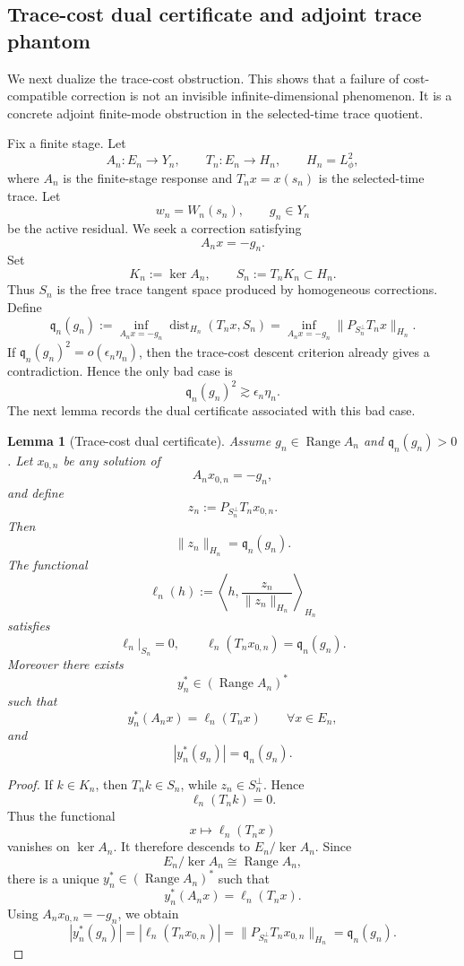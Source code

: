 \documentclass[11pt]{article}
\numberwithin{equation}{section}
\theoremstyle{plain}
\newtheorem{lemma}{Lemma}[section]
\theoremstyle{definition}
\theoremstyle{remark}
\DeclareMathOperator{\Range}{Range}
\begin{document}
\subsection{Trace-cost dual certificate and adjoint trace phantom}
\label{pV:sec:trace-cost-dual-certificate}

We next dualize the trace-cost obstruction.  This shows that a failure of cost-compatible correction is not an invisible infinite-dimensional phenomenon.  It is a concrete adjoint finite-mode obstruction in the selected-time trace quotient.

Fix a finite stage.  Let
\[
        A_n:E_n\to Y_n,
        \qquad
        T_n:E_n\to H_n,
        \qquad
        H_n=L^2_\phi,
\]
where \(A_n\) is the finite-stage response and \(T_nx=x(s_n)\) is the selected-time trace.  Let
\[
        w_n=W_n(s_n),
        \qquad
        g_n\in Y_n
\]
be the active residual.  We seek a correction satisfying
\[
        A_nx=-g_n.
\]
Set
\[
        K_n:=\ker A_n,
        \qquad
        S_n:=T_nK_n\subset H_n.
\]
Thus \(S_n\) is the free trace tangent space produced by homogeneous corrections.  Define
\[
        \mathfrak q_n(g_n)
        :=
        \inf_{A_nx=-g_n}
        \operatorname{dist}_{H_n}(T_nx,S_n)
        =
        \inf_{A_nx=-g_n}
        \|P_{S_n^\perp}T_nx\|_{H_n}.
\]
If \(\mathfrak q_n(g_n)^2=o(\epsilon_n\eta_n)\), then the trace-cost descent criterion already gives a contradiction.  Hence the only bad case is
\[
        \mathfrak q_n(g_n)^2\gtrsim \epsilon_n\eta_n.
\]
The next lemma records the dual certificate associated with this bad case.

\begin{lemma}[Trace-cost dual certificate]
\label{pV:lem:trace-cost-dual-certificate}
Assume \(g_n\in\Range A_n\) and \(\mathfrak q_n(g_n)>0\).  Let \(x_{0,n}\) be any solution of
\[
        A_nx_{0,n}=-g_n,
\]
and define
\[
        z_n:=P_{S_n^\perp}T_nx_{0,n}.
\]
Then
\[
        \|z_n\|_{H_n}=\mathfrak q_n(g_n).
\]
The functional
\[
        \ell_n(h):=
        \left\langle h,\frac{z_n}{\|z_n\|_{H_n}}\right\rangle_{H_n}
\]
satisfies
\[
        \ell_n|_{S_n}=0,
        \qquad
        \ell_n(T_nx_{0,n})=\mathfrak q_n(g_n).
\]
Moreover there exists
\[
        y_n^*\in(\Range A_n)^*
\]
such that
\[
        y_n^*(A_nx)=\ell_n(T_nx)
        \qquad\forall x\in E_n,
\]
and
\[
        |y_n^*(g_n)|=\mathfrak q_n(g_n).
\]
\end{lemma}

\begin{proof}
If \(k\in K_n\), then \(T_nk\in S_n\), while \(z_n\in S_n^\perp\).  Hence
\[
        \ell_n(T_nk)=0.
\]
Thus the functional
\[
        x\mapsto\ell_n(T_nx)
\]
vanishes on \(\ker A_n\).  It therefore descends to \(E_n/\ker A_n\).  Since
\[
        E_n/\ker A_n\cong\Range A_n,
\]
there is a unique \(y_n^*\in(\Range A_n)^*\) such that
\[
        y_n^*(A_nx)=\ell_n(T_nx).
\]
Using \(A_nx_{0,n}=-g_n\), we obtain
\[
        |y_n^*(g_n)|
        =
        |\ell_n(T_nx_{0,n})|
        =
        \|P_{S_n^\perp}T_nx_{0,n}\|_{H_n}
        =
        \mathfrak q_n(g_n).
\]
\end{proof}
\end{document}
